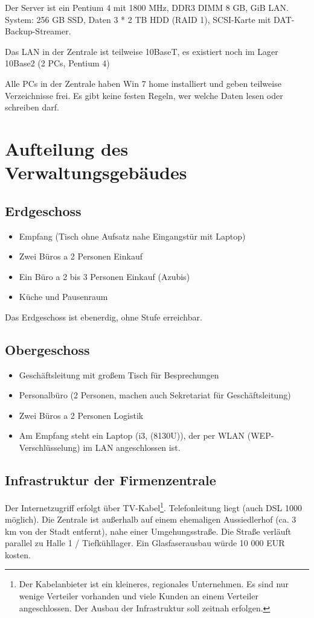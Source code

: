 \documentclass[a4paper,10pt]{scrreprt}
\begin{document}
Der Server ist ein Pentium 4 mit 1800 MHz, DDR3 DIMM 8 GB, GiB LAN. System: 256 GB SSD, Daten 3 * 2 TB HDD (RAID 1), SCSI-Karte
mit DAT-Backup-Streamer.

Das LAN in der Zentrale ist teilweise 10BaseT, es existiert noch im Lager 10Base2 (2 PCs, Pentium 4)

Alle PCs in der Zentrale haben Win 7 home installiert und geben teilweise Verzeichnisse frei. Es gibt keine festen Regeln, wer welche Daten lesen oder schreiben darf.
\section{Aufteilung des Verwaltungsgebäudes}
\subsection{Erdgeschoss}
\begin{itemize}
 \item Empfang (Tisch ohne Aufsatz nahe Eingangstür mit Laptop)
 \item Zwei Büros a 2 Personen Einkauf
 \item Ein Büro a 2 bis 3 Personen Einkauf (Azubis)
 \item Küche und Pausenraum
\end{itemize}

Das Erdgeschoss ist ebenerdig, ohne Stufe erreichbar.

\subsection{Obergeschoss}
\begin{itemize}
 \item Geschäftsleitung mit großem Tisch für Besprechungen
 \item Personalbüro (2 Personen, machen auch Sekretariat für Geschäftsleitung)
 \item Zwei Büros a 2 Personen Logistik
 \item Am Empfang steht ein Laptop (i3, (8130U)), der per WLAN (WEP-Ver\-schlüs\-se\-lung) im LAN angeschlossen ist.
\end{itemize}

\subsection{Infrastruktur der Firmenzentrale}
Der Internetzugriff erfolgt über TV-Kabel\footnote{Der Kabelanbieter ist ein kleineres, regionales Unternehmen. Es sind nur wenige Verteiler vorhanden und viele Kunden an einem Verteiler angeschlossen. Der Ausbau der Infrastruktur soll zeitnah erfolgen.}. Telefonleitung liegt (auch DSL 1000 möglich). Die Zentrale ist außerhalb auf einem ehemaligen
Aussiedlerhof (ca. 3 km von der Stadt entfernt), nahe einer Umgehungsstraße. Die Straße verläuft parallel zu Halle 1 / Tiefkühllager. Ein Glasfaserausbau würde 10 000 EUR kosten.
\end{document}
